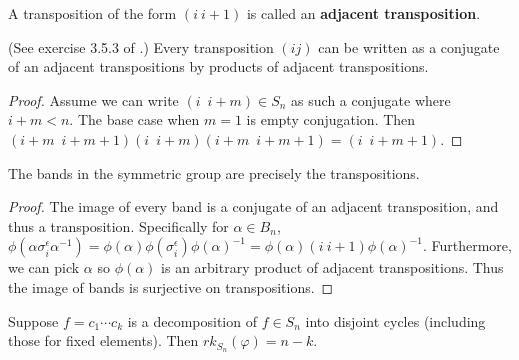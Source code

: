 \documentclass[12pt]{thesis}
\begin{document}
\begin{definition}
    A transposition of the form $(i\ i+1)$ is called an \textbf{adjacent transposition}.
\end{definition}

\begin{lemma}
    (See exercise 3.5.3 of \cite{dummit-and-foote}.)
    Every transposition $(i j)$ can be written
    as a conjugate of an adjacent transpositions
    by products of adjacent transpositions. 
\end{lemma}

\begin{proof}
    Assume we can write $(i\enspace  i + m) \in S_{n}$ as such a conjugate where $i + m < n$.
    The base case when $m = 1$ is empty conjugation.
    Then $(i + m\enspace i + m + 1) (i\enspace i + m) (i + m\enspace i + m + 1) = (i\enspace i + m + 1)$.
\end{proof}

\begin{proposition}
    \label{prop:bands-are-transpositions}
    The bands in the symmetric group are precisely the transpositions.
\end{proposition}

\begin{proof}
    The image of every band
    is a conjugate of an adjacent transposition,
    and thus a transposition.
    Specifically for $\alpha \in B_{n}$,
    $\phi(\alpha\sigma_{i}^{\epsilon}\alpha^{-1}) = \phi(\alpha)\phi(\sigma_{i}^{\epsilon})\phi(\alpha)^{-1} = \phi(\alpha) (i\ i+1) \phi(\alpha)^{-1}$.
    Furthermore, we can pick $\alpha$ so $\phi(\alpha)$ is an arbitrary
    product of adjacent transpositions.
    Thus the image of bands is surjective on transpositions.
\end{proof}

\begin{proposition}
    Suppose $f = c_{1} \cdots c_{k}$ is a decomposition
    of $f \in S_{n}$ into disjoint cycles (including those for fixed elements).
    Then $rk_{S_{n}}(\varphi) = n - k$.
\end{proposition}
\end{document}
